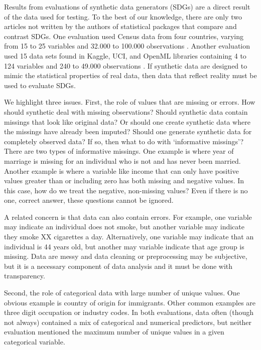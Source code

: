 \documentclass[runningheads]{llncs}
\begin{document}
Results from evaluations of synthetic data generators (SDGs) are a direct result of the data used for testing.  To the best of our knowledge, there are only two articles not written by the authors of statistical packages that compare and contrast SDGs.  One evaluation used Census data from four countries, varying from 15 to 25 variables and 32.000 to 100.000 observations \cite{little2022comparing}.  Another evaluation used 15 data sets found in Kaggle, UCI, and OpenML libraries containing 4 to 124 variables and 240 to 49.000 observations \cite{dankar2021fake}.  If synthetic data are designed to mimic the statistical properties of real data, then data that reflect reality must be used to evaluate SDGs.  

We highlight three issues.  First, the role of values that are missing or errors.  How should synthetic deal with missing observations?  Should synthetic data contain missings that look like original data?  Or should one create synthetic data where the missings have already been imputed?  Should one generate synthetic data for completely observed data?  If so, then what to do with `informative missings'?  There are two types of informative missings.  One example is where year of marriage is missing for an individual who is not and has never been married.  Another example is where a variable like income that can only have positive values greater than or including zero has both missing and negative values.  In this case, how do we treat the negative, non-missing values?  Even if there is no one, correct answer, these questions cannot be ignored.

A related concern is that data can also contain errors.  For example, one variable may indicate an individual does not smoke, but another variable may indicate they smoke XX cigarettes a day.  Alternatively, one variable may indicate that an individual is 44 years old, but another may variable indicate that age group is missing.  Data are messy and data cleaning or preprocessing may be subjective, but it is a necessary component of data analysis and it must be done with transparency.

Second, the role of categorical data with large number of unique values.  One obvious example is country of origin for immigrants.  Other common examples are three digit occupation or industry codes.  In both evaluations, data often (though not always) contained a mix of categorical and numerical predictors, but neither evaluation mentioned the maximum number of unique values in a given categorical variable.  
\end{document}
